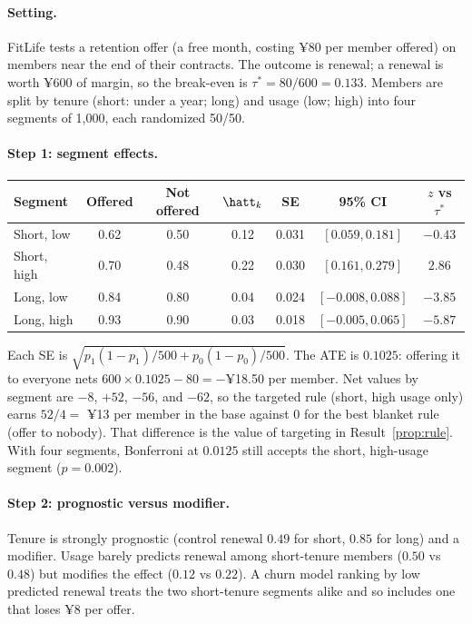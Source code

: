 \documentclass[11pt]{article}
\begin{document}
\sectiontwo

\paragraph{Setting.} FitLife tests a retention offer (a free month, costing ¥80 per member offered) on members
near the end of their contracts. The outcome is renewal; a renewal is worth ¥600 of margin, so the break-even is
$\tau^\ast = 80/600 = 0.133$. Members are split by tenure (short: under a year; long) and usage (low; high) into
four segments of 1{,}000, each randomized 50/50.

\paragraph{Step 1: segment effects.}
\begin{center}
\begin{tabular}{lcccccc}
\toprule
Segment & Offered & Not offered & $\hatt_k$ & SE & 95\% CI & $z$ vs $\tau^\ast$ \\
\midrule
Short, low  & 0.62 & 0.50 & 0.12 & 0.031 & $[0.059, 0.181]$ & $-0.43$ \\
Short, high & 0.70 & 0.48 & 0.22 & 0.030 & $[0.161, 0.279]$ & $2.86$ \\
Long, low   & 0.84 & 0.80 & 0.04 & 0.024 & $[-0.008, 0.088]$ & $-3.85$ \\
Long, high  & 0.93 & 0.90 & 0.03 & 0.018 & $[-0.005, 0.065]$ & $-5.87$ \\
\bottomrule
\end{tabular}
\end{center}
Each SE is $\sqrt{p_1(1-p_1)/500 + p_0(1-p_0)/500}$. The ATE is $0.1025$: offering it to everyone nets
$600 \times 0.1025 - 80 = -$¥18.50 per member. Net values by segment are $-8$, $+52$, $-56$, and $-62$, so the
targeted rule (short, high usage only) earns $52/4 = $ ¥13 per member in the base against $0$ for the best
blanket rule (offer to nobody). That difference is the value of targeting in Result~\ref{prop:rule}. With four segments, Bonferroni
at $0.0125$ still accepts the short, high-usage segment ($p = 0.002$).

\paragraph{Step 2: prognostic versus modifier.} Tenure is strongly prognostic (control renewal $0.49$ for short,
$0.85$ for long) and a modifier. Usage barely predicts renewal among short-tenure members ($0.50$ vs $0.48$) but
modifies the effect ($0.12$ vs $0.22$). A churn model ranking by low predicted renewal treats the two short-tenure
segments alike and so includes one that loses ¥8 per offer.
\end{document}
